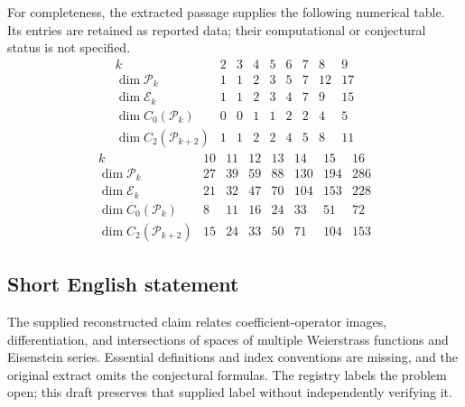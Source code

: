 \documentclass[11pt]{article}
\begin{document}
For completeness, the extracted passage supplies the following numerical table. Its entries are retained as reported data; their computational or conjectural status is not specified.
\[
\begin{array}{c|rrrrrrrr}
k&2&3&4&5&6&7&8&9\\\hline
\dim\mathcal P_k&1&1&2&3&5&7&12&17\\
\dim\mathcal E_k&1&1&2&3&4&7&9&15\\
\dim C_0(\mathcal P_k)&0&0&1&1&2&2&4&5\\
\dim C_2(\mathcal P_{k+2})&1&1&2&2&4&5&8&11
\end{array}
\]
\[
\begin{array}{c|rrrrrrr}
k&10&11&12&13&14&15&16\\\hline
\dim\mathcal P_k&27&39&59&88&130&194&286\\
\dim\mathcal E_k&21&32&47&70&104&153&228\\
\dim C_0(\mathcal P_k)&8&11&16&24&33&51&72\\
\dim C_2(\mathcal P_{k+2})&15&24&33&50&71&104&153
\end{array}
\]
\subsection{Short English statement}
The supplied reconstructed claim relates coefficient-operator images, differentiation, and intersections of spaces of multiple Weierstrass functions and Eisenstein series. Essential definitions and index conventions are missing, and the original extract omits the conjectural formulas. The registry labels the problem open; this draft preserves that supplied label without independently verifying it.
\end{document}
